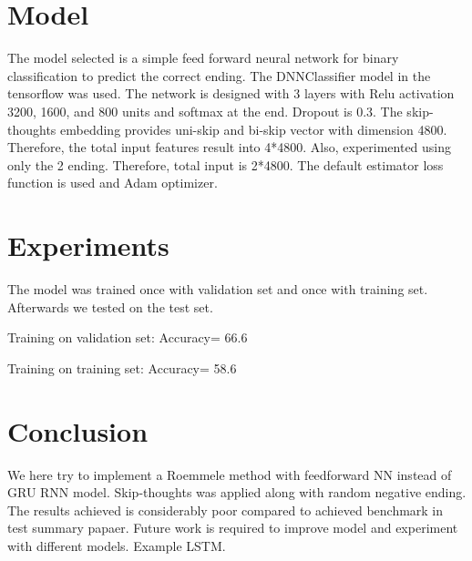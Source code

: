 \documentclass{article}
\begin{document}
\section{Model}
The model selected is a simple feed forward neural network for binary classification to predict the correct ending. The DNNClassifier model in the tensorflow was used. The network is designed with 3 layers with Relu activation 3200, 1600, and 800 units and softmax at the end. Dropout is 0.3.
The skip-thoughts embedding provides uni-skip and bi-skip vector with dimension 4800. Therefore, the total input features result into 4*4800. Also, experimented using only the 2 ending. Therefore, total input is 2*4800.
The default estimator loss function is used and Adam optimizer.
\section{Experiments}
The model was trained once with validation set and once with training set. Afterwards we tested on the test set.

Training on validation set: Accuracy= 66.6%

Training on training set: Accuracy= 58.6%

\section{Conclusion}
We here try to implement a Roemmele method with feedforward NN instead of GRU RNN model. Skip-thoughts was applied along with random negative ending. The results achieved is considerably poor compared to achieved benchmark in test summary papaer. Future work is required to improve model and experiment with different models. Example LSTM.
\end{document}
